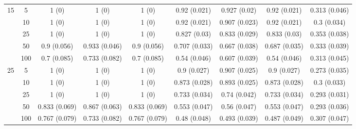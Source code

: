 \documentclass[10pt]{article}
\theoremstyle{definition}
\begin{document}
\begin{sidewaysfigure}
\begin{tabular}{cc|ccc|cccc}
    \multirow{5}{*}{15} & 5  & 1 (0) & 1 (0) & 1 (0) & 0.92 (0.021) & 0.927 (0.02) & 0.92 (0.021) & 0.313 (0.046) \\ 
    & 10  & 1 (0) & 1 (0) & 1 (0) & 0.92 (0.021) & 0.907 (0.023) & 0.92 (0.021) & 0.3 (0.034) \\ 
   & 25  & 1 (0) & 1 (0) & 1 (0) & 0.827 (0.03) & 0.833 (0.029) & 0.833 (0.03) & 0.353 (0.038) \\ 
  & 50  & 0.9 (0.056) & 0.933 (0.046) & 0.9 (0.056) & 0.707 (0.033) & 0.667 (0.038) & 0.687 (0.035) & 0.333 (0.039) \\ 
    & 100  & 0.7 (0.085) & 0.733 (0.082) & 0.7 (0.085) & 0.54 (0.046) & 0.607 (0.039) & 0.54 (0.046) & 0.313 (0.045) \\[.3cm] 
   \multirow{5}{*}{25} & 5  & 1 (0) & 1 (0) & 1 (0) & 0.9 (0.027) & 0.907 (0.025) & 0.9 (0.027) & 0.273 (0.035) \\ 
    & 10  & 1 (0) & 1 (0) & 1 (0) & 0.873 (0.028) & 0.893 (0.025) & 0.873 (0.028) & 0.3 (0.033) \\ 
    & 25  & 1 (0) & 1 (0) & 1 (0) & 0.733 (0.034) & 0.74 (0.042) & 0.733 (0.034) & 0.293 (0.031) \\ 
    & 50  & 0.833 (0.069) & 0.867 (0.063) & 0.833 (0.069) & 0.553 (0.047) & 0.56 (0.047) & 0.553 (0.047) & 0.293 (0.036) \\ 
    & 100  & 0.767 (0.079) & 0.733 (0.082) & 0.767 (0.079) & 0.48 (0.048) & 0.493 (0.039) & 0.487 (0.049) & 0.307 (0.047) \\ 
\end{tabular}
\end{sidewaysfigure}
\end{document}
